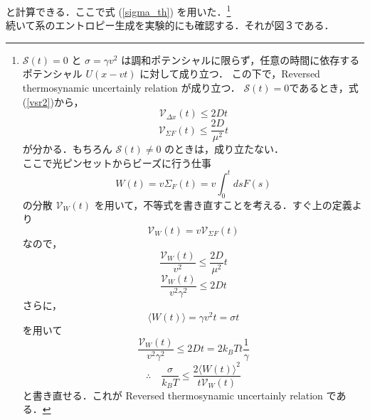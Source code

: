 \documentclass{jsarticle}
\numberwithin{equation}{section}
\theoremstyle{definition}
\begin{document}
と計算できる．ここで式 (\ref{sigma_th}) を用いた．\footnote{
$\mathcal{S} (t) = 0 $ と $\sigma = \gamma v^2$ は調和ポテンシャルに限らず，任意の時間に依存するポテンシャル $U(x - vt)$ に対して成り立つ．
この下で，Reversed thermosynamic uncertainly relation が成り立つ．
$\mathcal{S} (t) = 0 $であるとき，式 (\ref{vsr2})から，
\begin{equation}
  \mathcal{V}_{\Delta x} (t) \leqslant 2Dt 
\end{equation}
\begin{equation}
  \mathcal{V}_{\Sigma F} (t) \leqslant \frac{2D}{\mu ^2} t 
\end{equation}
が分かる．もちろん $\mathcal{S} (t) \neq  0 $ のときは，成り立たない．\\
\quad ここで光ピンセットからビーズに行う仕事
\begin{equation}
  W(t) = v \Sigma _F (t) = v \int_0^t ds F(s)
\end{equation}
の分散 $\mathcal{V}_{W} (t)$ を用いて，不等式を書き直すことを考える．すぐ上の定義より
\begin{equation}
  \mathcal{V}_{W} (t) = v \mathcal{V}_{\Sigma F} (t)
\end{equation}
なので，
\begin{equation}
  \frac{\mathcal{V}_{W} (t)}{v^2} \leqslant \frac{2D}{\mu^2} t 
\end{equation}
\begin{equation}
  \frac{\mathcal{V}_{W} (t)}{v^2 \gamma^2} \leqslant 2Dt 
\end{equation}
さらに，
\begin{equation}
  \langle W(t) \rangle = \gamma v^2 t = \sigma t 
\end{equation}
を用いて
\begin{equation}
  \frac{\mathcal{V}_{W} (t)}{v^2 \gamma^2} \leqslant 2Dt  = 2 k_B T t \frac{1}{\gamma}
\end{equation}
\begin{equation}
  \therefore \quad \frac{\sigma }{k_B T} \leqslant \frac{2 \langle W(t) \rangle^2}{t \mathcal{V}_{W} (t)}
\end{equation}
と書き直せる．これが Reversed thermosynamic uncertainly relation である．} \\
\quad 続いて系のエントロピー生成を実験的にも確認する．それが図３である．
\end{document}
